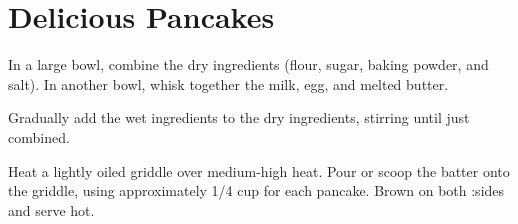 \chapter{Delicious Pancakes}



\vspace{-25pt}
In a large bowl, combine the dry ingredients (flour, sugar, baking powder, and salt). In another bowl, whisk together the milk, egg, and melted butter.

Gradually add the wet ingredients to the dry ingredients, stirring until just combined.

Heat a lightly oiled griddle over medium-high heat. Pour or scoop the batter onto the griddle, using approximately 1/4 cup for each pancake. Brown on both :sides and serve hot.

